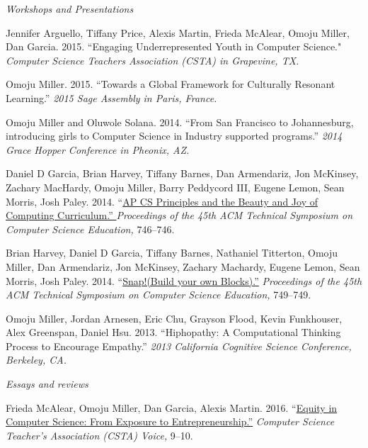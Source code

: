 \documentclass[11pt,article,oneside]{memoir}
\begin{document}
\bigskip

\noindent\emph{Workshops and Presentations  \vspace{0.05in}}


\ind Jennifer Arguello, Tiffany Price, Alexis Martin, Frieda McAlear, Omoju Miller, Dan Garcia. 2015. ``Engaging Underrepresented Youth in Computer Science."  \emph{Computer Science Teachers Association (CSTA) in Grapevine, TX.}

\ind Omoju Miller. 2015. ``Towards a Global Framework for Culturally Resonant Learning.'' \emph{2015 Sage Assembly in Paris, France.}

\ind Omoju Miller and Oluwole Solana. 2014. ``From San Francisco to Johannesburg, introducing girls to Computer Science in Industry supported programs.'' \emph{2014 Grace Hopper Conference in Pheonix, AZ.}

\ind Daniel D Garcia, Brian Harvey, Tiffany Barnes, Dan Armendariz, Jon McKinsey, Zachary MacHardy, Omoju Miller, Barry Peddycord III, Eugene Lemon, Sean Morris, Josh Paley. 2014. ``\href{http://dl.acm.org/citation.cfm?id=2539026}{AP CS Principles and the Beauty and Joy of Computing Curriculum.'' }\emph{Proceedings of the 45th ACM Technical Symposium on Computer Science Education,} 746--746.

\ind Brian Harvey, Daniel D Garcia, Tiffany Barnes, Nathaniel Titterton, Omoju Miller, Dan Armendariz, Jon McKinsey, Zachary Machardy, Eugene Lemon, Sean Morris, Josh Paley. 2014. ``\href{http://dl.acm.org/citation.cfm?id=2539022}{Snap!(Build your own Blocks).''} \emph{Proceedings of the 45th ACM Technical Symposium on Computer Science Education,} 749--749.

\ind Omoju Miller, Jordan Arnesen, Eric Chu, Grayson Flood, Kevin Funkhouser, Alex Greenspan, Daniel Hsu. 2013. ``Hiphopathy: A Computational Thinking Process to Encourage Empathy.'' \emph{2013 California Cognitive Science Conference, Berkeley, CA.}

\bigskip
\noindent\emph{Essays and reviews \vspace{0.05in}}



\ind Frieda McAlear, Omoju Miller, Dan Garcia, Alexis Martin. 2016. ``\href{http://www.csta.acm.org/Communications/sub/CSTAVoice_Files/csta_voice_01_2016.pdf}{Equity in Computer Science: From Exposure to Entrepreneurship.''} \emph{Computer Science Teacher's Association (CSTA) Voice, } 9--10.
\end{document}
